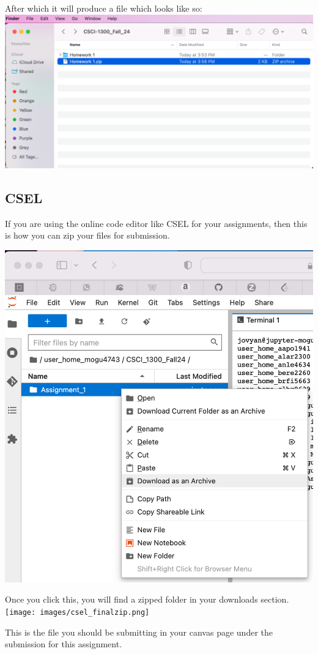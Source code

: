After which it will produce a file which looks like so:
\includegraphics[width=\textwidth]{images/submit_macos_zipfile.png}

\subsection{CSEL}

If you are using the online code editor like CSEL for your assignments, then this is how you can zip your files for submission.

\includegraphics[width=\textwidth]{images/csel_zipfile.png}

Once you click this, you will find a zipped folder in your downloads section.
\texttt{[image: images/csel\_finalzip.png]}

This is the file you should be submitting in your canvas page under the submission for this assignment.

